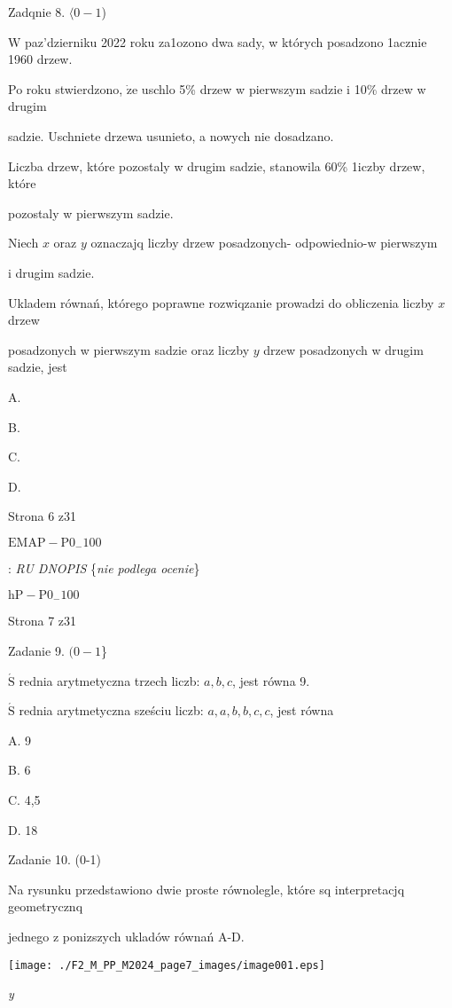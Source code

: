 \documentclass[a4paper,12pt]{article}
\begin{document}
Zadqnie 8. $\langle 0-1$)

$\mathrm{W}$ paz'dzierniku 2022 roku za1ozono dwa sady, w których posadzono 1acznie 1960 drzew.

Po roku stwierdzono, $\dot{\mathrm{z}}\mathrm{e}$ uschlo 5\% drzew w pierwszym sadzie i 10\% drzew w drugim

sadzie. Uschniete drzewa usunieto, a nowych nie dosadzano.

Liczba drzew, które pozostaly w drugim sadzie, stanowila 60\% 1iczby drzew, które

pozostaly w pierwszym sadzie.

Niech $x$ oraz $y$ oznaczajq liczby drzew posadzonych- odpowiednio-w pierwszym

i drugim sadzie.

Ukladem równań, którego poprawne rozwiqzanie prowadzi do obliczenia liczby $x$ drzew

posadzonych w pierwszym sadzie oraz liczby $y$ drzew posadzonych w drugim sadzie, jest

A. 

B. 

C. 

D. 

Strona 6 z31

$\mathrm{E}\mathrm{M}\mathrm{A}\mathrm{P}-\mathrm{P}0_{-}100$





: {\it RU DNOPIS} \{{\it nie podlega ocenie}\}

$\mathrm{h}\mathrm{P}-\mathrm{P}0_{-}100$

Strona 7 z31





Zadanie 9. $(0-1$\}

$\acute{\mathrm{S}}$ rednia arytmetyczna trzech liczb: $a, b, c$, jest równa 9.

$\acute{\mathrm{S}}$ rednia arytmetyczna sześciu liczb: $a, a, b, b, c, c$, jest równa

A. 9

B. 6

C. 4,5

D. 18

Zadanie 10. (0-1)

Na rysunku przedstawiono dwie proste równolegle, które sq interpretacjq geometrycznq

jednego z ponizszych ukladów równań A-D.
\begin{center}
\texttt{[image: ./F2\_M\_PP\_M2024\_page7\_images/image001.eps]}
\end{center}
{\it y}
\end{document}
